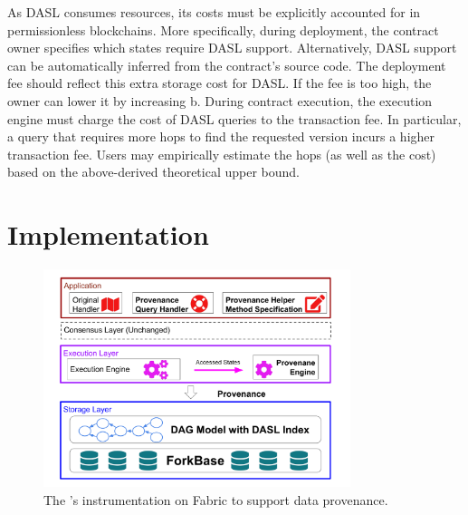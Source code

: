 As DASL consumes resources, its costs must be explicitly accounted for in permissionless blockchains.
More specifically, during deployment, the contract owner specifies which states require DASL support.
Alternatively, DASL support can be automatically inferred from the contract's source code. The deployment fee
should reflect this extra storage cost for DASL. If the fee is too high, the owner can lower it by increasing
b. During contract execution, the execution engine must charge the cost of DASL queries to the transaction
fee. In particular, a query that requires more hops to find the requested version incurs a higher transaction
fee. Users may empirically estimate the hops (as well as the cost) based on the above-derived theoretical upper bound. 

\section{Implementation}
\label{prov:sec:implementation}
\begin{figure}
  \centering
  \includegraphics[width=0.8\textwidth]{diagram/provenance/lineagechain.pdf}
  \caption{The {\fs}'s instrumentation on Fabric to support data provenance. }
  \label{prov:fig:architecture} 
\end{figure}

